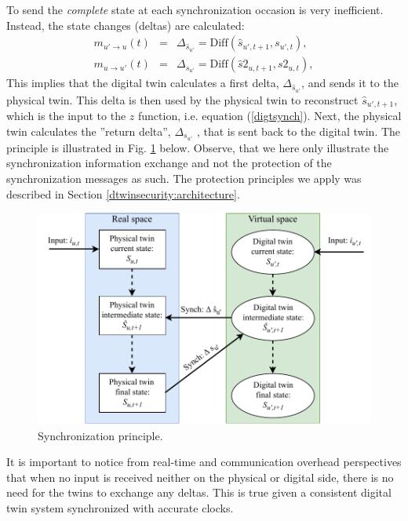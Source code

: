 To send the \textit{complete} state at each synchronization occasion is very inefficient. Instead, the state changes (deltas) are calculated:
\begin{eqnarray}
m_{u'\rightarrow u}(t) & = & \Delta_{\hat{s}_{u'}} =  \textrm{Diff}(\hat{s}_{u',t+1},s_{u',t}), \label{arch:firstdelta} \\
m_{u \rightarrow u'}(t) & = & \Delta_{s_{u'}} = 
\textrm{Diff}(\hat{s}2_{u,t+1},s2_{u,t}), \label{arch:seconddelta}
\end{eqnarray}
This implies that the digital twin calculates a first delta, $\Delta_{\hat{s}_{u'}}$, and sends it to the physical twin. This delta is then used by the physical twin to reconstruct $\hat{s}_{u',t+1}$, which is the input to the $z$ function, i.e. equation (\ref{digtsynch}). Next, the physical twin calculates the ''return delta'', $\Delta_{s_{u'}}$ , that is sent back to the digital twin.   The principle is illustrated in Fig. \ref{figure:digital_twin_synch} below. Observe, that we here only illustrate the synchronization information exchange and not the protection of the synchronization messages as such. The protection principles we apply was described in Section \ref{dtwinsecurity:architecture}.

\begin{figure}[ht]
   \centering
    \includegraphics[scale=0.55]{papers/digital-twin/images/FIG6_TII-19-1326}
    \caption{Synchronization principle.}
    \label{figure:digital_twin_synch}
\end{figure}

It is important to notice from real-time and communication overhead perspectives that when no input is received neither on the physical or digital side, there is no need for the twins to exchange any deltas. This is true given a consistent digital twin system synchronized with accurate clocks.

